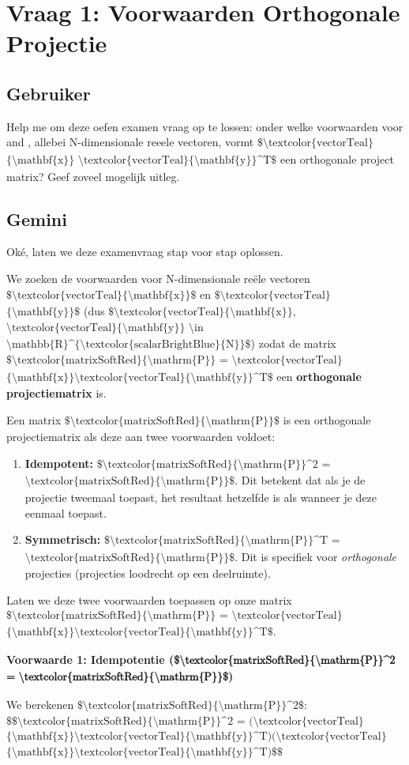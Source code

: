 \documentclass[12pt,a4paper]{article}
\title{\hdr{Gesprek over Orthogonale Projectiematrix $\mat{P}=\vect{x}\vect{y}^T$}}
\author{Gebruiker & Gemini}
\date{\today} %
\newcommand{\vect}[1]{\textcolor{vectorTeal}{\mathbf{#1}}}
\newcommand{\mat}[1]{\textcolor{matrixSoftRed}{\mathrm{#1}}}
\newcommand{\scal}[1]{\textcolor{scalarBrightBlue}{#1}}
\newcommand{\hdr}[1]{\textcolor{headerBrown}{#1}}
\begin{document}
\maketitle

\section*{Vraag 1: Voorwaarden Orthogonale Projectie}

\subsection*{Gebruiker}

Help me om deze oefen examen vraag op te lossen: onder welke voorwaarden voor \vect{x} and \vect{y}, allebei \scal{N}-dimensionale reeele vectoren, vormt $\vect{x} \vect{y}^T$ een orthogonale project matrix? Geef zoveel mogelijk uitleg.

\subsection*{Gemini}

Oké, laten we deze examenvraag stap voor stap oplossen.

We zoeken de voorwaarden voor \scal{N}-dimensionale reële vectoren $\vect{x}$ en $\vect{y}$ (dus $\vect{x}, \vect{y} \in \mathbb{R}^{\scal{N}}$) zodat de matrix $\mat{P} = \vect{x}\vect{y}^T$ een \textbf{\hdr{orthogonale projectiematrix}} is.

Een matrix $\mat{P}$ is een orthogonale projectiematrix als deze aan twee voorwaarden voldoet:
\begin{enumerate}
    \item \textbf{\hdr{Idempotent:}} $\mat{P}^2 = \mat{P}$. Dit betekent dat als je de projectie tweemaal toepast, het resultaat hetzelfde is als wanneer je deze eenmaal toepast.
    \item \textbf{\hdr{Symmetrisch:}} $\mat{P}^T = \mat{P}$. Dit is specifiek voor \textit{\hdr{orthogonale}} projecties (projecties loodrecht op een deelruimte).
\end{enumerate}

Laten we deze twee voorwaarden toepassen op onze matrix $\mat{P} = \vect{x}\vect{y}^T$.

\textbf{\hdr{Voorwaarde 1: Idempotentie ($\mat{P}^2 = \mat{P}$)}}

We berekenen $\mat{P}^2$:
$$ \mat{P}^2 = (\vect{x}\vect{y}^T)(\vect{x}\vect{y}^T) $$
\end{document}
